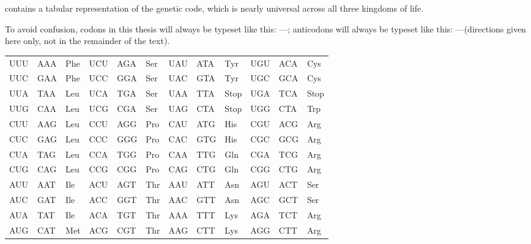  contains a tabular representation of the genetic code,
which is nearly universal across all three kingdoms of life.

To avoid confusion, codons in this thesis will always be typeset like this:
\fivep----\threep; anticodons will always be typeset like this:
\threep----\fivep (directions given here only, not in the
remainder of the text).

\begin{table}
    \centering
    \begin{tabu} to 
        \toprule
        UUU & AAA & Phe & UCU & AGA & Ser & UAU & ATA & Tyr & UGU & ACA & Cys \\
        UUC & GAA & Phe & UCC & GGA & Ser & UAC & GTA & Tyr & UGC & GCA & Cys \\
        UUA & TAA & Leu & UCA & TGA & Ser & UAA & TTA & Stop& UGA & TCA & Stop\\
        UUG & CAA & Leu & UCG & CGA & Ser & UAG & CTA & Stop& UGG & CTA & Trp \\
        \addlinespace
        CUU & AAG & Leu & CCU & AGG & Pro & CAU & ATG & His & CGU & ACG & Arg \\
        CUC & GAG & Leu & CCC & GGG & Pro & CAC & GTG & His & CGC & GCG & Arg \\
        CUA & TAG & Leu & CCA & TGG & Pro & CAA & TTG & Gln & CGA & TCG & Arg \\
        CUG & CAG & Leu & CCG & CGG & Pro & CAG & CTG & Gln & CGG & CTG & Arg \\
        \addlinespace
        AUU & AAT & Ile & ACU & AGT & Thr & AAU & ATT & Asn & AGU & ACT & Ser \\
        AUC & GAT & Ile & ACC & GGT & Thr & AAC & GTT & Asn & AGC & GCT & Ser \\
        AUA & TAT & Ile & ACA & TGT & Thr & AAA & TTT & Lys & AGA & TCT & Arg \\
        AUG & CAT & Met & ACG & CGT & Thr & AAG & CTT & Lys & AGG & CTT & Arg \\

\end{tabu}
\end{table}
